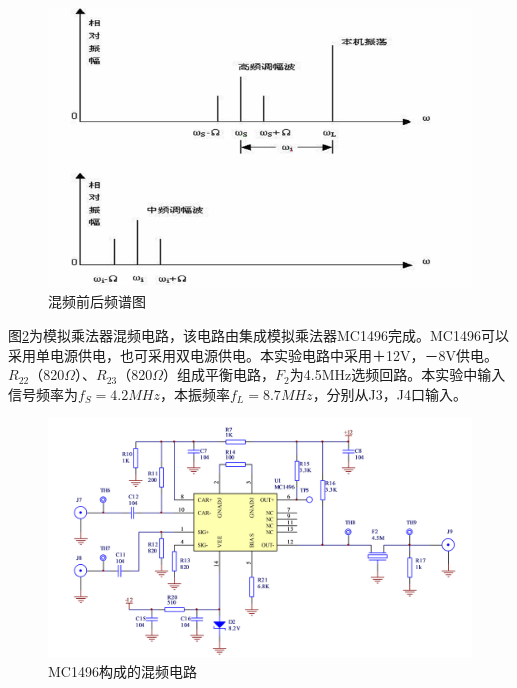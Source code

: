 \documentclass[12pt]{article}%
\numberwithin{equation}{section}
\begin{document}
       \begin{figure}[ht]
  \centering
  \includegraphics[width=.8\textwidth]{image010.png} 
  \caption{ 混频前后频谱图} 
  \label{img:cfhg} 
\end{figure}
    图\ref{img:cfhi}为模拟乘法器混频电路，该电路由集成模拟乘法器MC1496完成。MC1496可以采用单电源供电，也可采用双电源供电。本实验电路中采用＋12V，－8V供电。$R_{22}$（820$\Omega$）、$R_{23}$（820$\Omega$）组成平衡电路，$F_2$为4.5MHz选频回路。本实验中输入信号频率为$f_S=4.2MHz$，本振频率$f_L=8.7MHz$，分别从J3，J4口输入。
       \begin{figure}[ht]
  \centering
  \includegraphics[width=\textwidth]{image002.png} 
  \caption{ MC1496构成的混频电路} 
  \label{img:cfhi} 
\end{figure}
\end{document}
